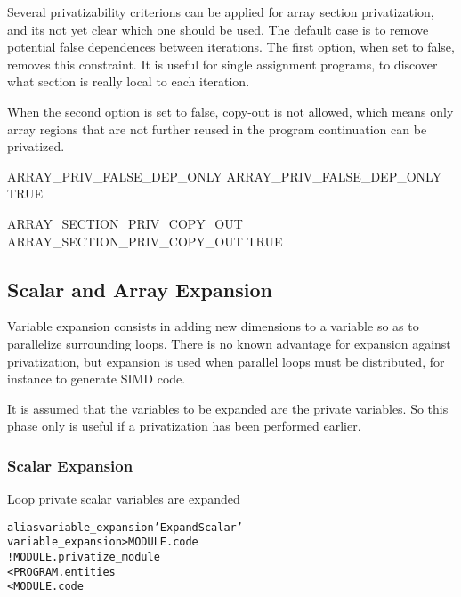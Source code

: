 \documentclass[a4paper]{report}
\newenvironment{PipsMake}{\begin{alltt}}{\end{alltt}}
\newenvironment{PipsPass}[1]{\label{pass:#1}}{}
\begin{document}
Several privatizability criterions can be applied for array
section privatization, and its not yet clear which one should be used. The
default case is to remove potential false dependences between
iterations. The first option, when set to false, removes this
constraint. It is useful for single assignment programs, to discover
what section is really local to each iteration.

When the second option is set to false, copy-out is not allowed,
which means only array regions that are not further reused in the program
continuation can be privatized.

\begin{PipsProp}{ARRAY_PRIV_FALSE_DEP_ONLY}
ARRAY_PRIV_FALSE_DEP_ONLY TRUE
\end{PipsProp}

\begin{PipsProp}{ARRAY_SECTION_PRIV_COPY_OUT}
ARRAY_SECTION_PRIV_COPY_OUT TRUE
\end{PipsProp}


\subsection{Scalar and Array Expansion}
\label{subsection-scalar-and-array-expansion}

Variable expansion consists in adding new dimensions to a variable so as
to parallelize surrounding loops. There is no known advantage for
expansion against privatization, but expansion is used when parallel loops
must be distributed, for instance to generate SIMD code.

It is assumed that the variables to be expanded are the private
variables. So this phase only is useful if a privatization has been
performed earlier.

\subsubsection{Scalar Expansion}

\begin{PipsPass}{variable_expansion}
Loop private scalar variables are expanded
\end{PipsPass}

\begin{PipsMake}
alias variable_expansion 'Expand Scalar'
variable_expansion                    > MODULE.code
		! MODULE.privatize_module
        < PROGRAM.entities
        < MODULE.code
\end{PipsMake}
\end{document}
